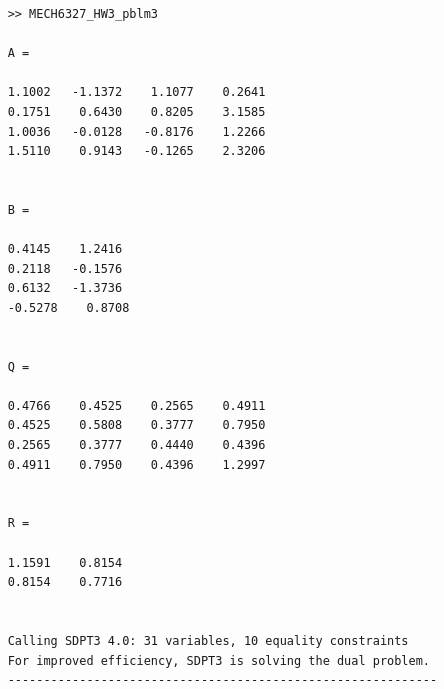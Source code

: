 \documentclass[letter]{article}
\begin{document}
\begin{Verbatim}
	>> MECH6327_HW3_pblm3
	
	A =
	
	1.1002   -1.1372    1.1077    0.2641
	0.1751    0.6430    0.8205    3.1585
	1.0036   -0.0128   -0.8176    1.2266
	1.5110    0.9143   -0.1265    2.3206
	
	
	B =
	
	0.4145    1.2416
	0.2118   -0.1576
	0.6132   -1.3736
	-0.5278    0.8708
	
	
	Q =
	
	0.4766    0.4525    0.2565    0.4911
	0.4525    0.5808    0.3777    0.7950
	0.2565    0.3777    0.4440    0.4396
	0.4911    0.7950    0.4396    1.2997
	
	
	R =
	
	1.1591    0.8154
	0.8154    0.7716
	
	
	Calling SDPT3 4.0: 31 variables, 10 equality constraints
	For improved efficiency, SDPT3 is solving the dual problem.
	------------------------------------------------------------
	

\end{Verbatim}
\end{document}

